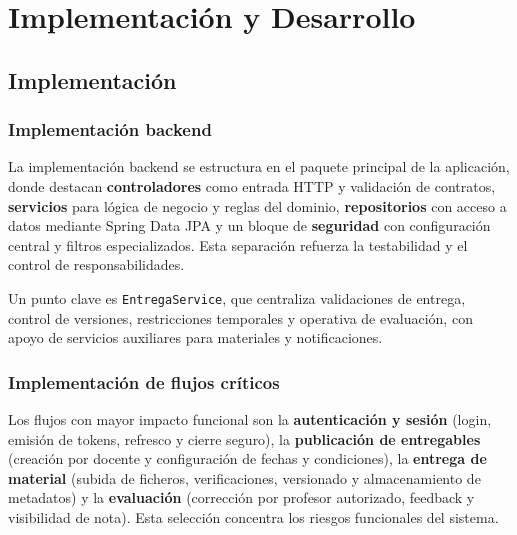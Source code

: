 \chapter{Implementaci\'on y Desarrollo}\label{cap_implementacion}
\makeatletter
{}
\makeatother

\FloatBarrier
\section{Implementaci\'on}


\subsection{Implementaci\'on backend}

La implementaci\'on backend se estructura en el paquete principal de la aplicaci\'on, donde destacan \textbf{controladores} como entrada HTTP y validaci\'on de contratos, \textbf{servicios} para l\'ogica de negocio y reglas del dominio, \textbf{repositorios} con acceso a datos mediante Spring Data JPA y un bloque de \textbf{seguridad} con configuraci\'on central y filtros especializados. Esta separaci\'on refuerza la testabilidad y el control de responsabilidades.

Un punto clave es \texttt{EntregaService}, que centraliza validaciones de entrega,
control de versiones, restricciones temporales y operativa de evaluaci\'on,
con apoyo de servicios auxiliares para materiales y notificaciones.

\subsection{Implementaci\'on de flujos cr\'iticos}

Los flujos con mayor impacto funcional son la \textbf{autenticaci\'on y sesi\'on} (login, emisi\'on de tokens, refresco y cierre seguro), la \textbf{publicaci\'on de entregables} (creaci\'on por docente y configuraci\'on de fechas y condiciones), la \textbf{entrega de material} (subida de ficheros, verificaciones, versionado y almacenamiento de metadatos) y la \textbf{evaluaci\'on} (correcci\'on por profesor autorizado, feedback y visibilidad de nota). Esta selecci\'on concentra los riesgos funcionales del sistema.

